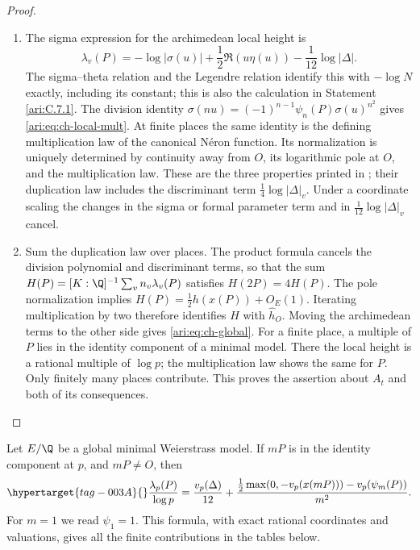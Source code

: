 \begin{proof}
\begin{enumerate}[label=\arabic*.,leftmargin=*]
\item The sigma expression for the archimedean local height is
\[
 \lambda_v(P)=-\log|\sigma(u)|
       +\frac12\Re(u\eta(u))-\frac1{12}\log|\Delta|.
\]
The sigma--theta relation and the Legendre relation identify this
with $-\log N$ exactly, including its constant; this is also the
calculation in Statement \ref{ari:C.7.1}. The division identity
$\sigma(nu)=(-1)^{n-1}\psi_n(P)\sigma(u)^{n^2}$ gives
\eqref{ari:eq:ch-local-mult}. At finite places the same identity is
the defining multiplication law of the canonical N\'eron function.
Its normalization is uniquely determined by continuity away from
$O$, its logarithmic pole at $O$, and the multiplication law.
These are the three properties printed in
\citet[Section 2.1]{demarco2017}; their duplication law includes
the discriminant term $\frac14\log|\Delta|_v$.
Under a coordinate scaling the changes in the sigma or formal
parameter term and in $\frac1{12}\log|\Delta|_v$ cancel.

\item Sum the duplication law over places. The product formula cancels
the division polynomial and discriminant terms, so that the sum
$H(P)=[K:\Q]^{-1}\sum_vn_v\lambda_v(P)$ satisfies
$H(2P)=4H(P)$. The pole normalization implies
$H(P)=\frac12h(x(P))+O_E(1)$. Iterating multiplication by two
therefore identifies $H$ with $\widehat h_O$. Moving the
archimedean terms to the other side gives \eqref{ari:eq:ch-global}.
For a finite place, a multiple of $P$ lies in the identity component
of a minimal model. There the local height is a rational multiple
of $\log p$; the multiplication law shows the same for $P$.
Only finitely many places contribute. This proves the assertion
about $A_t$ and both of its consequences.
\end{enumerate}
\end{proof}

\begin{proposition}\hypertarget{tag-000W}{}\label{ari:C.6.2}

Let $E/\Q$ be a global minimal Weierstrass model. If $mP$ is
in the identity component at $p$, and $mP\ne O$, then
\begin{equation}\hypertarget{tag-003A}{}\label{ari:eq:ch-local-exact}
 \frac{\lambda_p(P)}{\log p}
 =\frac{v_p(\Delta)}{12}
   +\frac{\frac12\max(0,-v_p(x(mP)))-v_p(\psi_m(P))}{m^2}.
\end{equation}
For $m=1$ we read $\psi_1=1$. This formula, with exact rational
coordinates and valuations, gives all the finite contributions
in the tables below.
\end{proposition}


